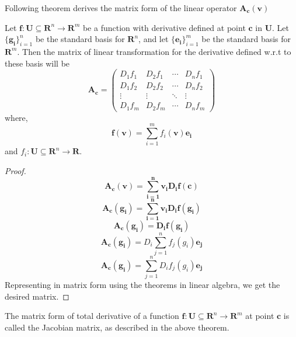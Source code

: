 Following theorem derives the matrix form of the linear operator $\bm{A_c(v)}$
\begin{theorem}
    Let $\bm{f} : \bm{U} \subseteq \bm{R}^n \rightarrow \bm{R}^m$ be a function
    with derivative defined at point $\bm{c}$ in $\bm{U}$. Let
    $\{\bm{g_i}\}_{i=1}^{n}$ be the standard basis for $\bm{R}^n$, and let
    $\{\bm{e_i}\}_{i=1}^{m}$ be the standard basis for $\bm{R}^m$. Then the
    matrix of linear transformation for the derivative defined w.r.t to these
    basis will be
    \[
        \bm{A_{c}} =
        \begin{pmatrix}
            D_{1}f_{1} & D_{2}f_{1} & \cdots & D_{n}f_{1} \\
            D_{1}f_{2} & D_{2}f_{2} & \cdots & D_{n}f_{2} \\
            \vdots  & \vdots  & \ddots & \vdots  \\
            D_{1}f_{m} & D_{2}f_{m} & \cdots & D_{n}f_{m}
        \end{pmatrix}
    \]
    where,
    \[
        \bm{f(v)} = \sum_{i=1}^{m} f_i(\bm{v}) \bm{e_i}
    \]
    and $f_i : \bm{U} \subseteq \bm{R}^n \rightarrow \bm{R}$.
\end{theorem}
\begin{proof}
    \[
        \bm{A_c(v) = \sum_{i = 1}^{n} v_i D_i f(c)}
    \]
    \[
        \bm{A_c(g_i) = \sum_{i = 1}^{n} v_i D_i f(g_i)}
    \]
    \[
        \bm{A_c(g_i) = D_i f(g_i)}
    \]
    \[
        \bm{A_c(g_i)} = D_i \sum_{j=1}^{n}f_j(g_i)\bm{e_j}
    \]
    \[
        \bm{A_c(g_i)} = \sum_{j=1}^{n} D_i f_j(g_i)\bm{e_j}
    \]
    Representing in matrix form using the theorems in linear algebra, we get the
    desired matrix.
\end{proof}
\begin{definition}
    The matrix form of total derivative of a function $\bm{f} : \bm{U} \subseteq
    \bm{R}^n \rightarrow \bm{R}^m$ at point $\bm{c}$ is called the Jacobian
    matrix, as described in the above theorem.
\end{definition}

